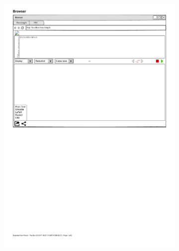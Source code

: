 \documentclass[parskip=full,11pt,twoside]{scrartcl}
\begin{document}
{\begin{figure}[H]
	\begin{subfigure}{0.25\textwidth}
		\centering
		\includegraphics{img/exportMenu}
	\end{subfigure}
	\begin{subfigure}{0.75\textwidth}
		\centering

\end{subfigure}
\end{figure}}
\end{document}
